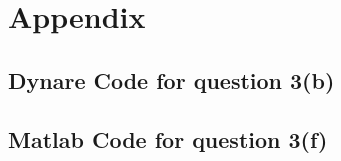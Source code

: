 \documentclass[a4paper,11pt]{article}
\begin{document}
\section{Appendix}
\subsection{Dynare Code for question 3(b)}


\pagebreak
\subsection{Matlab Code for question 3(f)}

\end{document}
